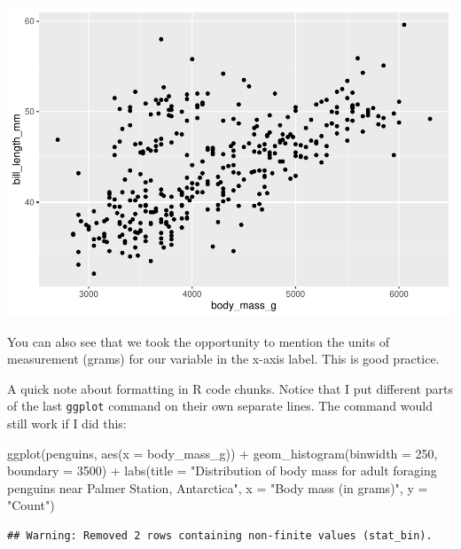 \documentclass[
]{book}
\newenvironment{Shaded}{\begin{snugshade}}{\end{snugshade}}
\newcommand{\AttributeTok}[1]{\textcolor[rgb]{0.77,0.63,0.00}{#1}}
\newcommand{\DecValTok}[1]{\textcolor[rgb]{0.00,0.00,0.81}{#1}}
\newcommand{\FunctionTok}[1]{\textcolor[rgb]{0.00,0.00,0.00}{#1}}
\newcommand{\NormalTok}[1]{#1}
\newcommand{\SpecialCharTok}[1]{\textcolor[rgb]{0.00,0.00,0.00}{#1}}
\newcommand{\StringTok}[1]{\textcolor[rgb]{0.31,0.60,0.02}{#1}}
\begin{document}
\includegraphics{intro_stats_files/figure-latex/unnamed-chunk-113-1.pdf}

You can also see that we took the opportunity to mention the units of measurement (grams) for our variable in the x-axis label. This is good practice.

A quick note about formatting in R code chunks. Notice that I put different parts of the last \texttt{ggplot} command on their own separate lines. The command would still work if I did this:

\begin{Shaded}
\begin{Highlighting}[]
\FunctionTok{ggplot}\NormalTok{(penguins, }\FunctionTok{aes}\NormalTok{(}\AttributeTok{x =}\NormalTok{ body\_mass\_g)) }\SpecialCharTok{+} \FunctionTok{geom\_histogram}\NormalTok{(}\AttributeTok{binwidth =} \DecValTok{250}\NormalTok{, }\AttributeTok{boundary =} \DecValTok{3500}\NormalTok{) }\SpecialCharTok{+} \FunctionTok{labs}\NormalTok{(}\AttributeTok{title =} \StringTok{"Distribution of body mass for adult foraging penguins near Palmer Station, Antarctica"}\NormalTok{, }\AttributeTok{x =} \StringTok{"Body mass (in grams)"}\NormalTok{, }\AttributeTok{y =} \StringTok{"Count"}\NormalTok{)}
\end{Highlighting}
\end{Shaded}

\begin{verbatim}
## Warning: Removed 2 rows containing non-finite values (stat_bin).
\end{verbatim}
\end{document}
